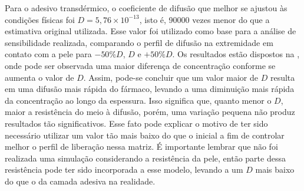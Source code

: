 Para o adesivo transdérmico, o coeficiente de difusão que melhor se ajustou às condições físicas foi $D = 5,76 \times 10^{-13}$, isto é, 90000 vezes menor do que a estimativa original utilizada. Esse valor foi utilizado como base para a análise de sensibilidade realizada, comparando o perfil de difusão na extremidade em contato com a pele para $-50\% D$, $D$ e $+50\%D$. Os resultados estão dispostos na , onde pode ser observada uma maior diferença de concentração conforme se aumenta o valor de $D$. Assim, pode-se concluir que um valor maior de $D$ resulta em uma difusão mais rápida do 
fármaco, levando a uma diminuição mais rápida da concentração ao longo da espessura. Isso significa que, quanto menor o $D$, maior a resistência do meio à difusão, porém, uma variação pequena não produz resultados tão significativos. Esse fato pode explicar o motivo de ter sido necessário utilizar um valor tão mais baixo do que o inicial a fim de controlar melhor o perfil de liberação nessa matriz. É importante lembrar que não foi realizada uma simulação considerando a resistência da pele, então parte dessa resistência pode ter sido incorporada a esse modelo, levando a um $D$ mais baixo do que o da camada adesiva na realidade.

